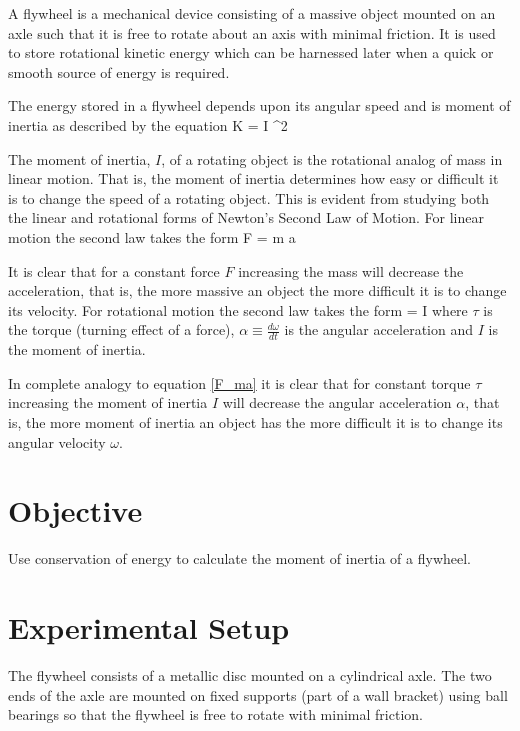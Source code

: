 A flywheel is a mechanical device consisting of a massive object mounted on an axle such that it is free to rotate about an axis with minimal friction. It is used to store rotational kinetic energy which can be harnessed later when a quick or smooth source of energy is required.

\diag

The energy stored in a flywheel depends upon its angular speed and is moment of inertia as described by the equation
%
\beq
    K =  I \omega^2
\eeq
%

The moment of inertia, $I$, of a rotating object is the rotational analog of mass in linear motion. That is, the moment of inertia determines how easy or difficult it is to change the speed of a rotating object. This is evident from studying both the linear and rotational forms of Newton's Second Law of Motion. For linear motion the second law takes the form
%
\beq \label{F_ma}
    F = m a
\eeq

It is clear that for a constant force $F$ increasing the mass will decrease the acceleration, that is, the more massive an object the more difficult it is to change its velocity. For rotational motion the second law takes the form
%
\beq
    \tau = I \alpha
\eeq
%
where $\tau$ is the torque (turning effect of a force), $\displaystyle \alpha \equiv \frac{d \omega}{dt}$ is the angular acceleration and $I$ is the moment of inertia.

In complete analogy to equation \eqref{F_ma} it is clear that for constant torque $\tau$ increasing the moment of inertia $I$ will decrease the angular acceleration $\alpha$, that is, the more moment of inertia an object has the more difficult it is to change its angular velocity $\omega$.

\section{Objective}

    Use conservation of energy to calculate the moment of inertia of a flywheel.

\section{Experimental Setup}

    The flywheel consists of a metallic disc mounted on a cylindrical axle. The two ends of the axle are mounted on fixed supports (part of a wall bracket) using ball bearings so that the flywheel is free to rotate with minimal friction.


